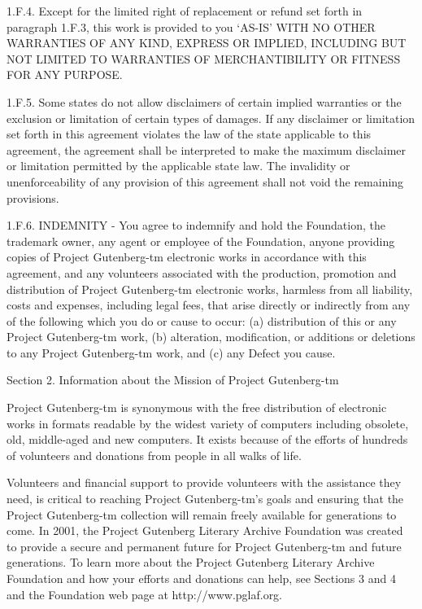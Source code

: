 1.F.4.  Except for the limited right of replacement or refund set forth
in paragraph 1.F.3, this work is provided to you ‘AS-IS’ WITH NO OTHER
WARRANTIES OF ANY KIND, EXPRESS OR IMPLIED, INCLUDING BUT NOT LIMITED TO
WARRANTIES OF MERCHANTIBILITY OR FITNESS FOR ANY PURPOSE.

1.F.5.  Some states do not allow disclaimers of certain implied
warranties or the exclusion or limitation of certain types of damages.
If any disclaimer or limitation set forth in this agreement violates the
law of the state applicable to this agreement, the agreement shall be
interpreted to make the maximum disclaimer or limitation permitted by
the applicable state law.  The invalidity or unenforceability of any
provision of this agreement shall not void the remaining provisions.

1.F.6.  INDEMNITY - You agree to indemnify and hold the Foundation, the
trademark owner, any agent or employee of the Foundation, anyone
providing copies of Project Gutenberg-tm electronic works in accordance
with this agreement, and any volunteers associated with the production,
promotion and distribution of Project Gutenberg-tm electronic works,
harmless from all liability, costs and expenses, including legal fees,
that arise directly or indirectly from any of the following which you do
or cause to occur: (a) distribution of this or any Project Gutenberg-tm
work, (b) alteration, modification, or additions or deletions to any
Project Gutenberg-tm work, and (c) any Defect you cause.


Section  2.  Information about the Mission of Project Gutenberg-tm

Project Gutenberg-tm is synonymous with the free distribution of
electronic works in formats readable by the widest variety of computers
including obsolete, old, middle-aged and new computers.  It exists
because of the efforts of hundreds of volunteers and donations from
people in all walks of life.

Volunteers and financial support to provide volunteers with the
assistance they need, is critical to reaching Project Gutenberg-tm’s
goals and ensuring that the Project Gutenberg-tm collection will
remain freely available for generations to come.  In 2001, the Project
Gutenberg Literary Archive Foundation was created to provide a secure
and permanent future for Project Gutenberg-tm and future generations.
To learn more about the Project Gutenberg Literary Archive Foundation
and how your efforts and donations can help, see Sections 3 and 4
and the Foundation web page at http://www.pglaf.org.


